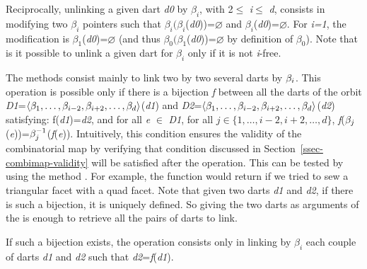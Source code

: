 Reciprocally, unlinking a given dart \emph{d0} by $\beta_i$, with 2$\leq$
\emph{i}$\leq$ \emph{d}, consists in modifying two $\beta_i$ pointers
such that $\beta_i(\beta_i$(\emph{d0}))=$\varnothing$ and
$\beta_i$(\emph{d0})=$\varnothing$.  For \emph{i=1}, the modification is
$\beta_1$(\emph{d0})=$\varnothing$ (and thus
$\beta_0(\beta_1$(\emph{d0}))=$\varnothing$ by definition of $\beta_0$).  Note
that is it possible to unlink a given dart for $\beta_i$ only if it is
not \emph{i}-free.

The  methods consist mainly to link two by two
several darts by $\beta_{i}$. This operation is possible only if there is
a bijection \emph{f} between all the darts of the orbit
\emph{D1}=$\langle{}\beta_{1},\ldots,\beta_{i-2},\beta_{i+2},\ldots,\beta_{d}\rangle{}$(\emph{d1}) and
\emph{D2}=$\langle{}\beta_{1},\ldots,\beta_{i-2},\beta_{i+2},\ldots,\beta_{d}\rangle{}$(\emph{d2})
satisfying: f(\emph{d1})=\emph{d2}, and for all \emph{e} $\in$ \emph{D1}, for all $j\in
\{1,\ldots,i-2,i+2,\ldots,d\}$,
\emph{f}($\beta_{j}$(\emph{e}))=$\beta_{j}^{-1}$(\emph{f}(\emph{e})).  Intuitively, this condition
ensures the validity of the combinatorial map by verifying that
condition discussed in Section~\ref{ssec-combimap-validity} will be
satisfied after the operation.  This can be tested by using the method
. For example, the function
 would return  if we tried to sew a
triangular facet with a quad facet. Note that given two darts \emph{d1}
and \emph{d2}, if there is such a bijection, it is uniquely defined. So giving
the two darts as arguments of the  is enough to retrieve
all the pairs of darts to link.

If such a bijection exists, the  operation
consists only in linking by $\beta_i$ each couple of darts \emph{d1} and
\emph{d2} such that \emph{d2}=\emph{f}(\emph{d1}).



